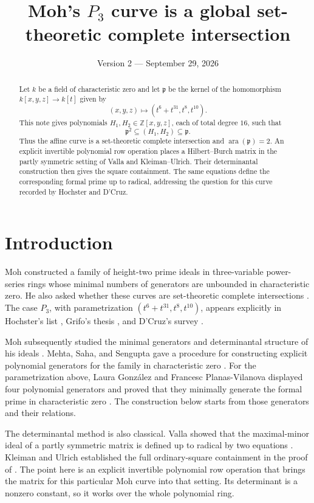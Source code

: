 \documentclass[11pt]{amsart}
\title{Moh's $P_3$ curve is a global set-theoretic complete intersection}
\date{Version 2 --- September 29, 2026}
\theoremstyle{remark}
\DeclareMathOperator{\ara}{ara}
\begin{document}
\begin{abstract}
Let $k$ be a field of characteristic zero and let $\mathfrak p$ be the kernel of the homomorphism $k[x,y,z]\to k[t]$ given by
\[
 (x,y,z)\longmapsto(t^6+t^{31},t^8,t^{10}).
\]
This note gives polynomials $H_1,H_2\in\mathbb Z[x,y,z]$, each of total degree $16$, such that
\[
 \mathfrak p^2\subseteq(H_1,H_2)\subseteq\mathfrak p.
\]
Thus the affine curve is a set-theoretic complete intersection and $\ara(\mathfrak p)=2$. An explicit invertible polynomial row operation places a Hilbert--Burch matrix in the partly symmetric setting of Valla and Kleiman--Ulrich. Their determinantal construction then gives the square containment. The same equations define the corresponding formal prime up to radical, addressing the question for this curve recorded by Hochster and D'Cruz.
\end{abstract}

\maketitle

\section{Introduction}

Moh constructed a family of height-two prime ideals in three-variable power-series rings whose minimal numbers of generators are unbounded in characteristic zero. He also asked whether these curves are set-theoretic complete intersections \cite[p.~733, Remark~1]{Moh1974}. The case $P_3$, with parametrization $(t^6+t^{31},t^8,t^{10})$, appears explicitly in Hochster's list \cite[Question~5]{Hochster2004}, Grifo's thesis \cite[Example~4.12]{Grifo2018}, and D'Cruz's survey \cite[Question~2.5]{DCruz2020}.

Moh subsequently studied the minimal generators and determinantal structure of his ideals \cite{Moh1979}. Mehta, Saha, and Sengupta gave a procedure for constructing explicit polynomial generators for the family in characteristic zero \cite{MehtaSahaSengupta2021}. For the parametrization above, Laura Gonz\'alez and Francesc Planas-Vilanova displayed four polynomial generators and proved that they minimally generate the formal prime in characteristic zero \cite[Discussion~4.6 and Theorem~4.7]{GonzalezPlanas2026}. The construction below starts from those generators and their relations.

The determinantal method is also classical. Valla showed that the maximal-minor ideal of a partly symmetric matrix is defined up to radical by two equations \cite[Theorem~2.1]{Valla1980}. Kleiman and Ulrich established the full ordinary-square containment in the proof of \cite[Lemma~2.5(3)]{KleimanUlrich1997}. The point here is an explicit invertible polynomial row operation that brings the matrix for this particular Moh curve into that setting. Its determinant is a nonzero constant, so it works over the whole polynomial ring.
\end{document}

